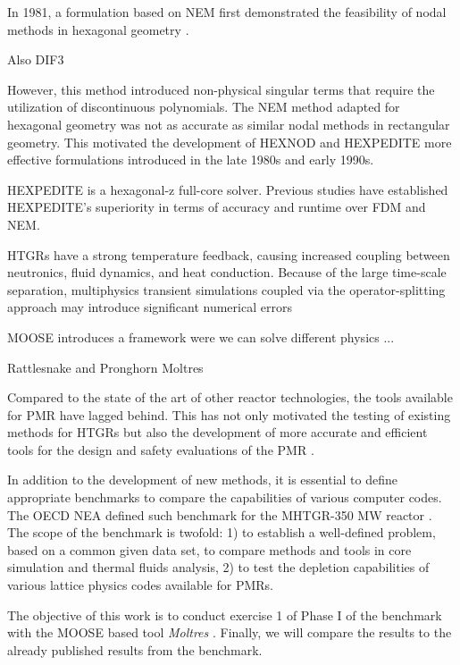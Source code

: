 \documentclass{anstrans}
\begin{document}
In 1981, a formulation based on \gls{NEM} first demonstrated the feasibility of nodal methods in hexagonal geometry \cite{duracz_nodal_1981}.

Also DIF3 \cite{lawrence_dif3d_1983}

However, this method introduced non-physical singular terms that require the utilization of discontinuous polynomials.
The \gls{NEM} method adapted for hexagonal geometry was not as accurate as similar nodal methods in rectangular geometry.
This motivated the development of HEXNOD \cite{wagner_three-dimensional_1989} and HEXPEDITE \cite{fitzpatrick_developments_1995} more effective formulations introduced in the late 1980s and early 1990s.

HEXPEDITE is a hexagonal-z full-core solver.
Previous studies \cite{} have established HEXPEDITE's superiority in terms of accuracy and runtime over \gls{FDM} and \gls{NEM}.

\cite{ortensi_deterministic_2010}

HTGRs have a strong temperature feedback, causing increased coupling between neutronics, fluid dynamics, and heat conduction.
Because of the large time-scale separation, multiphysics transient simulations coupled via the operator-splitting approach may introduce significant numerical errors \cite{ragusa_consistent_2009} \cite{park_tightly_2010} 

MOOSE introduces a framework were we can solve different physics ...

Rattlesnake and Pronghorn
Moltres

Compared to the state of the art of other reactor technologies, the tools available for \gls{PMR} have lagged behind.
This has not only motivated the testing of existing methods for \glspl{HTGR} but also the development of more accurate and efficient tools for the design and safety evaluations of the \gls{PMR} \cite{oecd_nea_benchmark_2017}.

In addition to the development of new methods, it is essential to define appropriate benchmarks to compare the capabilities of various computer codes.
The \gls{OECD} \gls{NEA} defined such benchmark for the \gls{MHTGR}-350 MW reactor \cite{oecd_nea_benchmark_2017}.
The scope of the benchmark is twofold: 1) to establish a well-defined problem, based on a common given data set, to compare methods and tools in core simulation and thermal fluids analysis, 2) to test the depletion capabilities of various lattice physics codes available for \glspl{PMR}.

The objective of this work is to conduct exercise 1 of Phase I of the benchmark with the \gls{MOOSE} \cite{gaston_physics-based_2015} based tool \textit{Moltres} \cite{lindsay_introduction_2018}.
Finally, we will compare the results to the already published results from the benchmark.
\end{document}
